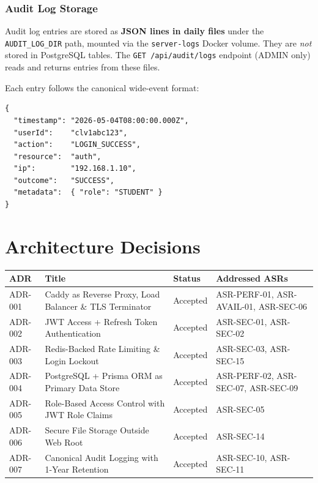 \documentclass[12pt,a4paper]{article}
\begin{document}
\subsubsection{Audit Log Storage}

Audit log entries are stored as \textbf{JSON lines in daily files} under the \texttt{AUDIT\_LOG\_DIR} path, mounted via the \texttt{server-logs} Docker volume. They are \emph{not} stored in PostgreSQL tables. The \texttt{GET /api/audit/logs} endpoint (ADMIN only) reads and returns entries from these files.

Each entry follows the canonical wide-event format:

\begin{lstlisting}[language={}]
{
  "timestamp": "2026-05-04T08:00:00.000Z",
  "userId":    "clv1abc123",
  "action":    "LOGIN_SUCCESS",
  "resource":  "auth",
  "ip":        "192.168.1.10",
  "outcome":   "SUCCESS",
  "metadata":  { "role": "STUDENT" }
}
\end{lstlisting}

\section{Architecture Decisions}

\begin{tabularx}{\textwidth}{L{1.8cm} L{5cm} L{1.8cm} L{5cm}}
  \toprule
  \textbf{ADR} & \textbf{Title} & \textbf{Status} & \textbf{Addressed ASRs} \\
  \midrule
  ADR-001 & Caddy as Reverse Proxy, Load Balancer \& TLS Terminator & Accepted & ASR-PERF-01, ASR-AVAIL-01, ASR-SEC-06 \\
  ADR-002 & JWT Access + Refresh Token Authentication & Accepted & ASR-SEC-01, ASR-SEC-02 \\
  ADR-003 & Redis-Backed Rate Limiting \& Login Lockout & Accepted & ASR-SEC-03, ASR-SEC-15 \\
  ADR-004 & PostgreSQL + Prisma ORM as Primary Data Store & Accepted & ASR-PERF-02, ASR-SEC-07, ASR-SEC-09 \\
  ADR-005 & Role-Based Access Control with JWT Role Claims & Accepted & ASR-SEC-05 \\
  ADR-006 & Secure File Storage Outside Web Root & Accepted & ASR-SEC-14 \\
  ADR-007 & Canonical Audit Logging with 1-Year Retention & Accepted & ASR-SEC-10, ASR-SEC-11 \\
  \bottomrule
\end{tabularx}
\end{document}
